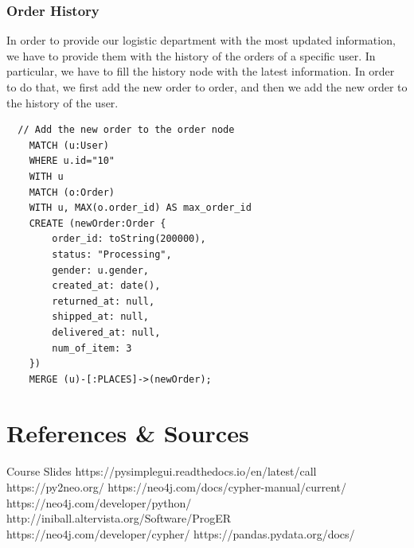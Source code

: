 \documentclass[a4paper,12pt]{article}
\begin{document}
\subsubsection{Order History}
In order to provide our logistic department with the most updated information, we have to provide them with the history of the orders of a specific user.
In particular, we have to fill the history node with the latest information. In order to do that, we first add the new order to order, and then we add the new order to the history of the user.
\begin{verbatim}
  // Add the new order to the order node
    MATCH (u:User)
    WHERE u.id="10"
    WITH u
    MATCH (o:Order)
    WITH u, MAX(o.order_id) AS max_order_id
    CREATE (newOrder:Order { 
        order_id: toString(200000), 
        status: "Processing",
        gender: u.gender,
        created_at: date(),
        returned_at: null,
        shipped_at: null,
        delivered_at: null,
        num_of_item: 3
    })
    MERGE (u)-[:PLACES]->(newOrder);
\end{verbatim}


\newpage
\section{References \& Sources}
  \begin{thebibliography}{9}
    \bibitem{} Course Slides
    \bibitem{} https://pysimplegui.readthedocs.io/en/latest/call%
    \bibitem{} https://py2neo.org/
    \bibitem{} https://neo4j.com/docs/cypher-manual/current/
    \bibitem{} https://neo4j.com/developer/python/
    \bibitem{} http://iniball.altervista.org/Software/ProgER
    \bibitem{} https://neo4j.com/developer/cypher/
    \bibitem{} https://pandas.pydata.org/docs/
  \end{thebibliography}
\end{document}
